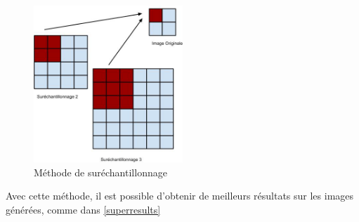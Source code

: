 \documentclass{article}
\begin{document}
\begin{figure}
  \begin{center}
  \includegraphics[width=0.5\textwidth]{images/supersampling.jpg}
  \end{center}
  \caption{Méthode de suréchantillonnage\label{super}}
\end{figure}

Avec cette méthode, il est possible d'obtenir de meilleurs résultats sur les images générées, comme dans \cref{superresults}
\end{document}

